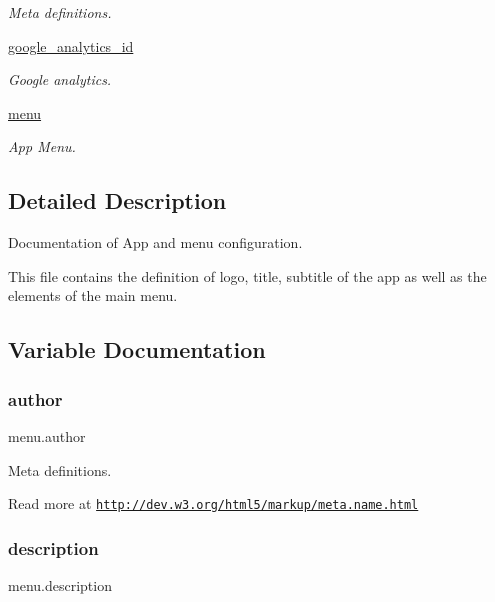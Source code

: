 \begin{DoxyCompactItemize}
\begin{DoxyCompactList}\small\item\em Meta definitions. \end{DoxyCompactList}\item 
\hyperlink{namespacemenu_a484e0dc2ddf36bc6a4c7afbfec0eba74}{google\+\_\+analytics\+\_\+id}
\begin{DoxyCompactList}\small\item\em Google analytics. \end{DoxyCompactList}\item 
\hyperlink{namespacemenu_ab310d6d9e1c5996d8b28b9e6896e8b22}{menu}
\begin{DoxyCompactList}\small\item\em App Menu. \end{DoxyCompactList}\end{DoxyCompactItemize}


\subsection{Detailed Description}
Documentation of App and menu configuration. 

This file contains the definition of logo, title, subtitle of the app as well as the elements of the main menu. 

\subsection{Variable Documentation}
\mbox{\label{namespacemenu_a2ec9f4f7a34fe891cd2319418749f622}} 
\subsubsection{\texorpdfstring{author}{author}}
{\footnotesize\ttfamily menu.\+author}



Meta definitions. 

Read more at \href{http://dev.w3.org/html5/markup/meta.name.html}{\tt http\+://dev.\+w3.\+org/html5/markup/meta.\+name.\+html} \mbox{\label{namespacemenu_ad1fc749539970e324fa264c8de439fa2}} 
\subsubsection{\texorpdfstring{description}{description}}
{\footnotesize\ttfamily menu.\+description}



